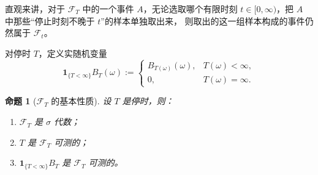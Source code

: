 \documentclass[UTF8,11pt,a4paper,oneside,fontset=fandol]{ctexrep}
\numberwithin{equation}{section}
\theoremstyle{zhthm}
\newtheorem{proposition}[theorem]{命题}
\newcommand{\F}{\mathcal{F}}
\newcommand{\ind}[1]{\mathbf{1}_{#1}}
\begin{document}
直观来讲，对于 $\F_T$ 中的一个事件 $A$，无论选取哪个有限时刻 $t\in[0,\infty)$，把 $A$ 中那些“停止时刻不晚于 $t$”的样本单独取出来，
则取出的这一组样本构成的事件仍然属于 $\F_t$。

对停时 $T$，定义实随机变量
\[
  \ind{\{T<\infty\}}B_T(\omega):=
  \begin{cases}
    B_{T(\omega)}(\omega), & T(\omega)<\infty,\\
    0, & T(\omega)=\infty.
  \end{cases}
\]

\begin{proposition}[$\F_T$ 的基本性质]
\label{prop:stopping-sigma-basics}
设 $T$ 是停时，则：
\begin{enumerate}
  \item $\F_T$ 是 $\sigma$ 代数；
  \item $T$ 是 $\F_T$ 可测的；
  \item $\ind{\{T<\infty\}}B_T$ 是 $\F_T$ 可测的。
\end{enumerate}
\end{proposition}
\end{document}
